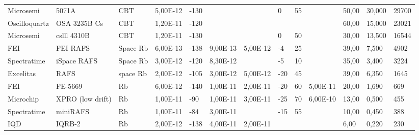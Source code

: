 \begin{table}
\begin{tabular}{ll|lllllllllll}
        Microsemi       & 5071A            & CBT           & 5,00E-12      & -130                   & ~              & ~                & 0             & 55            & ~               & 50,00          & 30,000          & 29700         \\
        Oscilloquartz   & OSA 3235B Cs     & CBT           & 1,20E-11      & -120                   & ~              & ~                & ~             & ~             & ~               & 60,00          & 15,000          & 23021         \\
        Microsemi       & cslll 4310B      & CBT           & 1,20E-11      & -130                   & ~              & ~                & 0             & 50            & ~               & 30,00          & 13,500          & 16544         \\
        FEI             & FEI RAFS         & Space Rb      & 6,00E-13      & -138                   & 9,00E-13       & 5,00E-12         & -4            & 25            & ~               & 39,00          & 7,500           & 4902          \\
        Spectratime     & iSpace RAFS      & Space Rb      & 3,00E-12      & -120                   & 8,30E-12       & ~                & -5            & 10            & ~               & 35,00          & 3,400           & 3224          \\
        Excelitas       & RAFS             & space Rb      & 2,00E-12      & -105                   & 3,00E-12       & 5,00E-12         & -20           & 45            & ~               & 39,00          & 6,350           & 1645          \\
        FEI             & FE-5669          & Rb            & 6,00E-12      & -140                   & 1,00E-11       & 2,00E-11         & -20           & 60            & 5,00E-11        & 20,00          & 1,690           & 669           \\
        Microchip       & XPRO (low drift) & Rb            & 1,00E-11      & -90                    & 1,00E-11       & 3,00E-11         & -25           & 70            & 6,00E-10        & 13,00          & 0,500           & 455           \\
        Spectratime     & miniRAFS         & Rb            & 1,00E-11      & -84                    & 3,00E-11       & ~                & -15           & 55            & ~               & 10,00          & 0,450           & 388           \\
        IQD             & IQRB-2           & Rb            & 2,00E-12      & -138                   & 4,00E-11       & 2,00E-11         & ~             & ~             & ~               & 6,00           & 0,220           & 230           \\

\end{tabular}
\end{table}
